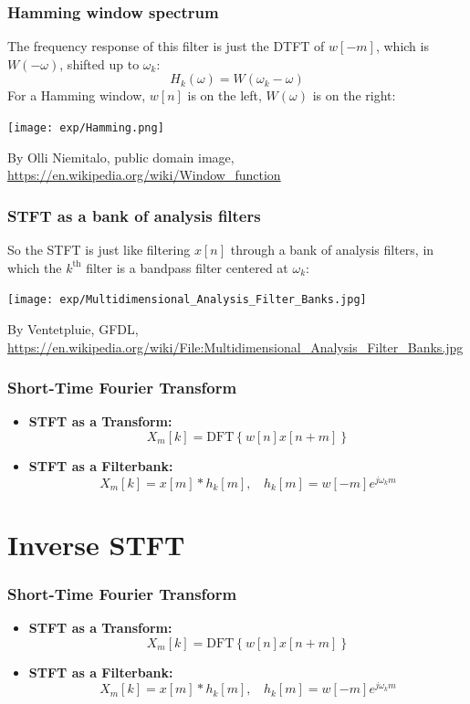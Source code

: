 \documentclass{beamer}
\begin{document}
\begin{frame}
  \frametitle{Hamming window spectrum}

  The frequency response of this filter is just the DTFT of $w[-m]$,
  which is $W(-\omega)$, shifted up to $\omega_k$:
  \[
  H_k(\omega) = W\left(\omega_k-\omega\right)
  \]
  For a Hamming window, $w[n]$ is on the left, $W(\omega)$ is on the right:
  \centerline{\texttt{[image: exp/Hamming.png]}}
  \begin{tiny}
    By Olli Niemitalo, public domain image,
    \url{https://en.wikipedia.org/wiki/Window_function}
  \end{tiny}
\end{frame}
  
\begin{frame}
  \frametitle{STFT as a bank of analysis filters}

  So the STFT is just like filtering $x[n]$ through a bank of analysis
  filters, in which the $k^{\textrm{th}}$ filter is a bandpass filter
  centered at $\omega_k$:
  \centerline{\texttt{[image: exp/Multidimensional\_Analysis\_Filter\_Banks.jpg]}}
  \begin{tiny}
    By Ventetpluie, GFDL,
    \url{https://en.wikipedia.org/wiki/File:Multidimensional_Analysis_Filter_Banks.jpg}
  \end{tiny}
\end{frame}

\begin{frame}
  \frametitle{Short-Time Fourier Transform}
  \begin{itemize}
  \item {\bf STFT as a Transform:}
    \[
    X_m[k] = \mbox{DFT}\left\{w[n]x[n+m]\right\}
    \]
  \item {\bf STFT as a Filterbank:}
    \[
    X_m[k] = x[m] \ast h_k[m],~~~~h_k[m] = w[-m]e^{j\omega_k m}
    \]
  \end{itemize}
\end{frame}


\section{Inverse STFT}
\setcounter{subsection}{1}

\begin{frame}
  \frametitle{Short-Time Fourier Transform}
  \begin{itemize}
  \item {\bf STFT as a Transform:}
    \[
    X_m[k] = \mbox{DFT}\left\{w[n]x[n+m]\right\}
    \]
  \item {\bf STFT as a Filterbank:}
    \[
    X_m[k] = x[m] \ast h_k[m],~~~~h_k[m] = w[-m]e^{j\omega_k m}
    \]
  \end{itemize}
\end{frame}
\end{document}
